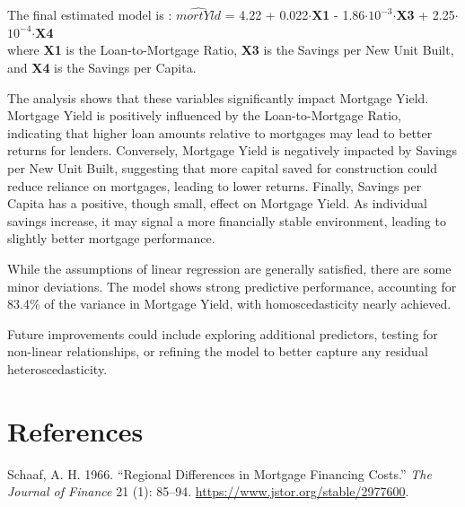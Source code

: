 \documentclass[
  12pt,
]{article}
\newlength{\cslhangindent}
\newenvironment{CSLReferences}[2] %
 {\begin{list}{}{%
  \setlength{\itemindent}{0pt}
  \setlength{\leftmargin}{0pt}
  \setlength{\parsep}{0pt}
  \ifodd #1
   \setlength{\leftmargin}{\cslhangindent}
   \setlength{\itemindent}{-1\cslhangindent}
  \fi
  \setlength{\itemsep}{#2\baselineskip}}}
 {\end{list}}
\begin{document}
The final estimated model is : \(\hat{mortYld}\) = 4.22 +
0.022\(\cdot\)\textbf{X1} - 1.86\(\cdot\)\(10^{-3}\)\(\cdot\)\textbf{X3}
+ 2.25\(\cdot\)\(10^{-4}\)\(\cdot\)\textbf{X4}\\
where \textbf{X1} is the Loan-to-Mortgage Ratio, \textbf{X3} is the
Savings per New Unit Built, and \textbf{X4} is the Savings per Capita.

The analysis shows that these variables significantly impact Mortgage
Yield. Mortgage Yield is positively influenced by the Loan-to-Mortgage
Ratio, indicating that higher loan amounts relative to mortgages may
lead to better returns for lenders. Conversely, Mortgage Yield is
negatively impacted by Savings per New Unit Built, suggesting that more
capital saved for construction could reduce reliance on mortgages,
leading to lower returns. Finally, Savings per Capita has a positive,
though small, effect on Mortgage Yield. As individual savings increase,
it may signal a more financially stable environment, leading to slightly
better mortgage performance.

While the assumptions of linear regression are generally satisfied,
there are some minor deviations. The model shows strong predictive
performance, accounting for 83.4\% of the variance in Mortgage Yield,
with homoscedasticity nearly achieved.

Future improvements could include exploring additional predictors,
testing for non-linear relationships, or refining the model to better
capture any residual heteroscedasticity.

\section*{References}\label{references}

\label{refs}
\begin{CSLReferences}{1}{0}
Schaaf, A. H. 1966. {``Regional Differences in Mortgage Financing
Costs.''} \emph{The Journal of Finance} 21 (1): 85--94.
\url{https://www.jstor.org/stable/2977600}.

\end{CSLReferences}
\end{document}
